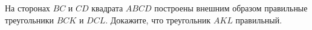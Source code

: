 \begin{ex}
	\begin{condition}
		На сторонах \( BC \) и \( CD \) квадрата \( ABCD \) построены внешним образом правильные треугольники \( BCK \) и \( DCL \). Докажите, что треугольник \( AKL \) правильный.
	\end{condition}
\end{ex}